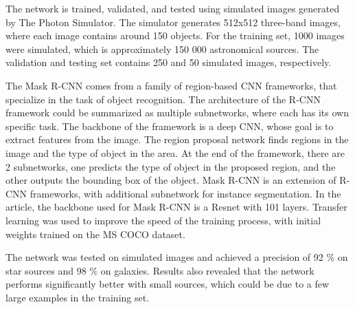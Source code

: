 The network is trained, validated, and tested using simulated images generated by The Photon Simulator. The simulator generates 512x512 three-band images, where each image contains around 150 objects. For the training set, 1000 images were simulated, which is approximately 150 000 astronomical sources. The validation and testing set contains 250 and 50 simulated images, respectively. 

The Mask R-CNN \cite{maskrcnn2017} comes from a family of region-based CNN frameworks, that specialize in the task of object recognition. The architecture of the R-CNN framework could be summarized as multiple subnetworks, where each has its own specific task. The backbone of the framework is a deep CNN, whose goal is to extract features from the image. The region proposal network finds regions in the image and the type of object in the area. At the end of the framework, there are 2 subnetworks, one predicts the type of object in the proposed region, and the other outputs the bounding box of the object. Mask R-CNN is an extension of R-CNN frameworks, with additional subnetwork for instance segmentation.
In the article, the backbone used for Mask R-CNN is a Resnet with 101 layers. Transfer learning was used to improve the speed of the training process, with initial weights trained on the MS COCO dataset.  

The network was tested on simulated images and achieved a precision of 92 \% on star sources and 98 \% on galaxies. Results also revealed that the network performs significantly better with small sources, which could be due to a few large examples in the training set. 

